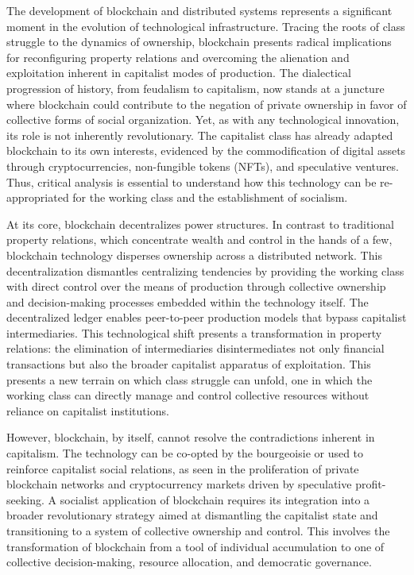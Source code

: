 \begin{refsection}
The development of blockchain and distributed systems represents a significant moment in the evolution of technological infrastructure. Tracing the roots of class struggle to the dynamics of ownership, blockchain presents radical implications for reconfiguring property relations and overcoming the alienation and exploitation inherent in capitalist modes of production. The dialectical progression of history, from feudalism to capitalism, now stands at a juncture where blockchain could contribute to the negation of private ownership in favor of collective forms of social organization. Yet, as with any technological innovation, its role is not inherently revolutionary. The capitalist class has already adapted blockchain to its own interests, evidenced by the commodification of digital assets through cryptocurrencies, non-fungible tokens (NFTs), and speculative ventures. Thus, critical analysis is essential to understand how this technology can be re-appropriated for the working class and the establishment of socialism.

At its core, blockchain decentralizes power structures. In contrast to traditional property relations, which concentrate wealth and control in the hands of a few, blockchain technology disperses ownership across a distributed network. This decentralization dismantles centralizing tendencies by providing the working class with direct control over the means of production through collective ownership and decision-making processes embedded within the technology itself. The decentralized ledger enables peer-to-peer production models that bypass capitalist intermediaries. This technological shift presents a transformation in property relations: the elimination of intermediaries disintermediates not only financial transactions but also the broader capitalist apparatus of exploitation. This presents a new terrain on which class struggle can unfold, one in which the working class can directly manage and control collective resources without reliance on capitalist institutions.

However, blockchain, by itself, cannot resolve the contradictions inherent in capitalism. The technology can be co-opted by the bourgeoisie or used to reinforce capitalist social relations, as seen in the proliferation of private blockchain networks and cryptocurrency markets driven by speculative profit-seeking. A socialist application of blockchain requires its integration into a broader revolutionary strategy aimed at dismantling the capitalist state and transitioning to a system of collective ownership and control. This involves the transformation of blockchain from a tool of individual accumulation to one of collective decision-making, resource allocation, and democratic governance.


\end{refsection}
